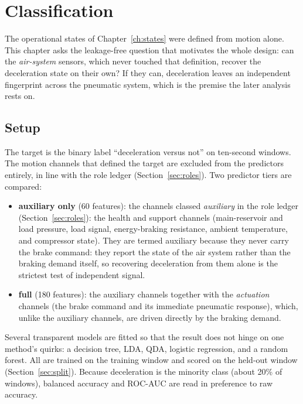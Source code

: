 \chapter{Classification}
\label{ch:classification}

The operational states of Chapter~\ref{ch:states} were defined from motion alone. This
chapter asks the leakage-free question that motivates the whole design: can the
\emph{air-system} sensors, which never touched that definition, recover the deceleration
state on their own? If they can, deceleration leaves an independent fingerprint across the
pneumatic system, which is the premise the later analysis rests on.

\section{Setup}

The target is the binary label \enquote{deceleration versus not} on ten-second windows.
The motion channels that defined the target are excluded from the predictors entirely, in
line with the role ledger (Section~\ref{sec:roles}). Two predictor tiers are compared:

\begin{itemize}
  \item \textbf{auxiliary only} (60 features): the channels classed \emph{auxiliary} in the
        role ledger (Section~\ref{sec:roles}): the health and support channels (main-reservoir
        and load pressure, load signal, energy-braking resistance, ambient temperature, and
        compressor state). They are termed auxiliary because they never carry the brake command:
        they report the state of the air system rather than the braking demand itself, so
        recovering deceleration from them alone is the strictest test of independent signal.
  \item \textbf{full} (180 features): the auxiliary channels together with the \emph{actuation}
        channels (the brake command and its immediate pneumatic response), which, unlike the
        auxiliary channels, are driven directly by the braking demand.
\end{itemize}

Several transparent models are fitted so that the result does not hinge on one method's
quirks: a decision tree, LDA, QDA, logistic regression, and a random forest. All are
trained on the training window and scored on the held-out window
(Section~\ref{sec:split}). Because deceleration is the minority class (about 20\% of
windows), balanced accuracy and ROC-AUC are read in preference to raw accuracy.

